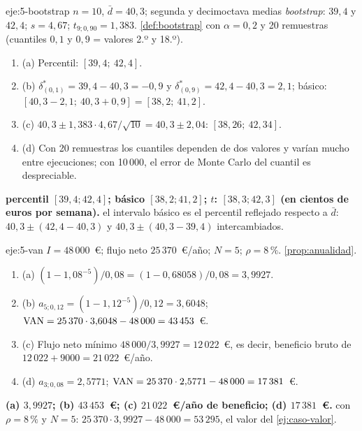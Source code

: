\begin{solucion}{eje:5-bootstrap}
\datos $n=10$, $\bar d=40{,}3$; segunda y decimoctava medias \emph{bootstrap}: $39{,}4$ y $42{,}4$; $s=4{,}67$; $t_{9;0{,}90}=1{,}383$.
\planteamiento \cref{def:bootstrap} con $\alpha=0{,}2$ y 20 remuestras (cuantiles $0{,}1$ y $0{,}9$ = valores 2.º y 18.º).
\pasos
\begin{enumerate}[label=\arabic*.]
  \item (a) Percentil: $[39{,}4;\ 42{,}4]$.
  \item (b) $\delta^{*}_{(0{,}1)}=39{,}4-40{,}3=-0{,}9$ y $\delta^{*}_{(0{,}9)}=42{,}4-40{,}3=2{,}1$; básico: $[40{,}3-2{,}1;\ 40{,}3+0{,}9]=[38{,}2;\ 41{,}2]$.
  \item (c) $40{,}3\pm1{,}383\cdot4{,}67/\sqrt{10}=40{,}3\pm2{,}04$: $[38{,}26;\ 42{,}34]$.
  \item (d) Con 20 remuestras los cuantiles dependen de dos valores y varían mucho entre ejecuciones; con 10\,000, el error de Monte Carlo del cuantil es despreciable.
\end{enumerate}
\resultado \textbf{percentil $[39{,}4;42{,}4]$; básico $[38{,}2;41{,}2]$; $t$: $[38{,}3;42{,}3]$ (en cientos de euros por semana).}
\comprobacion el intervalo básico es el percentil reflejado respecto a $\bar d$: $40{,}3\pm(42{,}4-40{,}3)$ y $40{,}3\pm(40{,}3-39{,}4)$ intercambiados.
\end{solucion}

\begin{solucion}{eje:5-van}
\datos $I=48\,000$~€; flujo neto $25\,370$~€/año; $N=5$; $\rho=8\,\%$.
\planteamiento \cref{prop:anualidad}.
\pasos
\begin{enumerate}[label=\arabic*.]
  \item (a) $(1-1{,}08^{-5})/0{,}08=(1-0{,}68058)/0{,}08=3{,}9927$.
  \item (b) $a_{5;0{,}12}=(1-1{,}12^{-5})/0{,}12=3{,}6048$; $\operatorname{VAN}=25\,370\cdot3{,}6048-48\,000=43\,453$~€.
  \item (c) Flujo neto mínimo $48\,000/3{,}9927=12\,022$~€, es decir, beneficio bruto de $12\,022+9000=21\,022$~€/año.
  \item (d) $a_{3;0{,}08}=2{,}5771$; $\operatorname{VAN}=25\,370\cdot2{,}5771-48\,000=17\,381$~€.
\end{enumerate}
\resultado \textbf{(a) $3{,}9927$; (b) $43\,453$~€; (c) $21\,022$~€/año de beneficio; (d) $17\,381$~€.}
\comprobacion con $\rho=8\,\%$ y $N=5$: $25\,370\cdot3{,}9927-48\,000=53\,295$, el valor del \cref{ej:caso-valor}.
\end{solucion}

